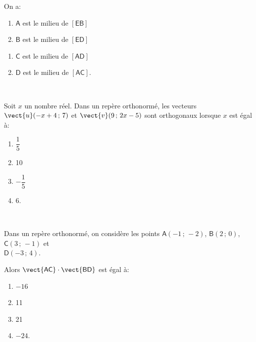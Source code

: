 \begin{description}
On a:

\begin{enumerate}[label=\textbf{\alph{*}.},itemjoin=\hfil,afterlabel={~~}]
\item $\mathsf{A}$ est le milieu de $[\mathsf{EB}]$ \item $\mathsf{B}$ est le milieu de $[\mathsf{ED}]$
\end{enumerate}

\begin{enumerate}[resume,label=\textbf{\alph{*}.},itemjoin=\hfil,afterlabel={~~}]
\item $\mathsf{C}$ est le milieu de $[\mathsf{AD}]$ \item $\mathsf{D}$ est le milieu de $[\mathsf{AC}]$.
\end{enumerate}

\item[Question 4:]\ 

Soit $x$ un nombre réel. Dans un repère orthonormé, les vecteurs $\vect{u}(-x+4\,;\,7)$ et $\vect{v}(9\,;\,2x-5)$ sont
orthogonaux lorsque $x$ est égal à:

\begin{enumerate}[label=\textbf{\alph{*}.},itemjoin=\hfil,afterlabel={~~}]
\item $\dfrac{1}{5}$
\item 10
\item $-\dfrac{1}{5}$
\item 6.
\end{enumerate}

\item[Question 5:]\ 

Dans un repère orthonormé, on considère les points $\mathsf{A}(-1\,;\,-2)$, $\mathsf{B}(2\,;\,0)$, $\mathsf{C}(3\,;\,-1)$ et\\
$\mathsf{D}(-3\,;\,4)$.

Alors $\vect{\mathsf{AC}}\cdot\vect{\mathsf{BD}}$ est égal à:

\begin{enumerate}[label=\textbf{\alph{*}.},itemjoin=\hfil,afterlabel={~~}]
\item $-16$
\item 11
\item 21
\item $-24$.
\end{enumerate}
\end{description}
